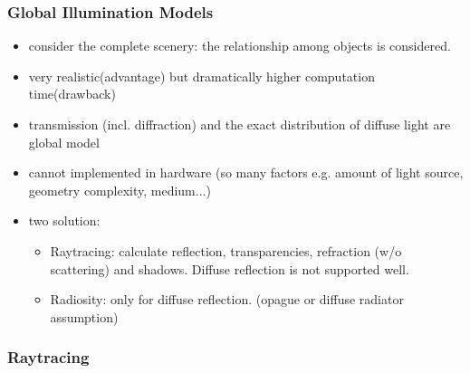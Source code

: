 \documentclass{standalone}
\begin{document}
\subsubsection{Global Illumination Models}

\begin{itemize}
	\item consider the complete scenery: the relationship among objects is considered.
	\item very realistic(advantage) but dramatically higher computation time(drawback)
	\item transmission (incl. diffraction) and the exact distribution of diffuse light are global model
	\item cannot implemented in hardware (so many factors e.g. amount of light source, geometry complexity, medium...)
	\item two solution:
		\begin{itemize}
			\item Raytracing: calculate reflection, transparencies, refraction (w/o scattering) and shadows. Diffuse reflection is not supported well.
			\item Radiosity: only for diffuse reflection. (opague or diffuse radiator assumption)
		\end{itemize}
\end{itemize}

\subsubsection{Raytracing}
\end{document}
